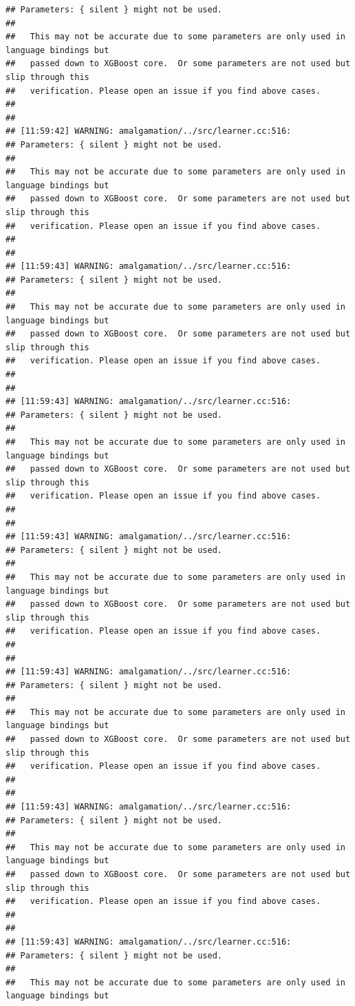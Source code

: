 \documentclass[AMS,STIX2COL]{WileyNJD-v2}\usepackage[]{graphicx}\usepackage[]{color}
\makeatletter
\newenvironment{kframe}{%
 \def\at@end@of@kframe{}%
 \ifinner\ifhmode%
  \def\at@end@of@kframe{\end{minipage}}%
  \begin{minipage}{\columnwidth}%
 \fi\fi%
 \def\FrameCommand##1{\hskip\@totalleftmargin \hskip-\fboxsep
 \colorbox{shadecolor}{##1}\hskip-\fboxsep
     \hskip-\linewidth \hskip-\@totalleftmargin \hskip\columnwidth}%
 \MakeFramed {\advance\hsize-\width
   \@totalleftmargin\z@ \linewidth\hsize
   \@setminipage}}%
 {\par\unskip\endMakeFramed%
 \at@end@of@kframe}
\newenvironment{knitrout}{}{} %
\makeatother
\begin{document}
\begin{knitrout}
\begin{kframe}
\begin{verbatim}
## Parameters: { silent } might not be used.
## 
##   This may not be accurate due to some parameters are only used in language bindings but
##   passed down to XGBoost core.  Or some parameters are not used but slip through this
##   verification. Please open an issue if you find above cases.
## 
## 
## [11:59:42] WARNING: amalgamation/../src/learner.cc:516: 
## Parameters: { silent } might not be used.
## 
##   This may not be accurate due to some parameters are only used in language bindings but
##   passed down to XGBoost core.  Or some parameters are not used but slip through this
##   verification. Please open an issue if you find above cases.
## 
## 
## [11:59:43] WARNING: amalgamation/../src/learner.cc:516: 
## Parameters: { silent } might not be used.
## 
##   This may not be accurate due to some parameters are only used in language bindings but
##   passed down to XGBoost core.  Or some parameters are not used but slip through this
##   verification. Please open an issue if you find above cases.
## 
## 
## [11:59:43] WARNING: amalgamation/../src/learner.cc:516: 
## Parameters: { silent } might not be used.
## 
##   This may not be accurate due to some parameters are only used in language bindings but
##   passed down to XGBoost core.  Or some parameters are not used but slip through this
##   verification. Please open an issue if you find above cases.
## 
## 
## [11:59:43] WARNING: amalgamation/../src/learner.cc:516: 
## Parameters: { silent } might not be used.
## 
##   This may not be accurate due to some parameters are only used in language bindings but
##   passed down to XGBoost core.  Or some parameters are not used but slip through this
##   verification. Please open an issue if you find above cases.
## 
## 
## [11:59:43] WARNING: amalgamation/../src/learner.cc:516: 
## Parameters: { silent } might not be used.
## 
##   This may not be accurate due to some parameters are only used in language bindings but
##   passed down to XGBoost core.  Or some parameters are not used but slip through this
##   verification. Please open an issue if you find above cases.
## 
## 
## [11:59:43] WARNING: amalgamation/../src/learner.cc:516: 
## Parameters: { silent } might not be used.
## 
##   This may not be accurate due to some parameters are only used in language bindings but
##   passed down to XGBoost core.  Or some parameters are not used but slip through this
##   verification. Please open an issue if you find above cases.
## 
## 
## [11:59:43] WARNING: amalgamation/../src/learner.cc:516: 
## Parameters: { silent } might not be used.
## 
##   This may not be accurate due to some parameters are only used in language bindings but

\end{verbatim}
\end{kframe}
\end{knitrout}
\end{document}
